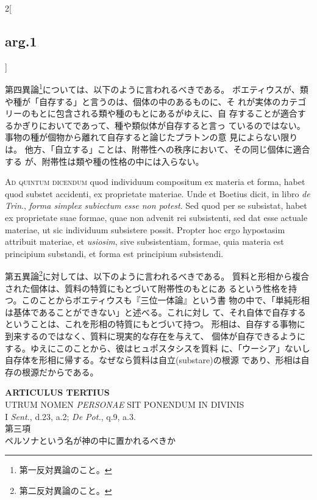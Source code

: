 \documentclass[paper=a4paper,fontsize=10pt,jafontsize=9pt,titlepage]{jlreq}
\begin{document}
\begin{paracol}{2}[\subsection{arg.1}]
\switchcolumn

第四異論\footnote{第一反対異論のこと。}については、以下のように言われるべきである。
ボエティウスが、類や種が「自存する」と言うのは、個体の中のあるものに、そ
 れが実体のカテゴリーのもとに包含される類や種のもとにあるがゆえに、自
 存することが適合するかぎりにおいてであって、種や類似体が自存すると言っ
 ているのではない。事物の種が個物から離れて自存すると論じたプラトンの意
 見によらない限りは。
他方、「自立する」ことは、附帯性への秩序において、その同じ個体に適合する
 が、附帯性は類や種の性格の中には入らない。

\switchcolumn*[\subsection{ad.5}]

{\scshape Ad quintum dicendum} quod individuum compositum ex materia et forma,
habet quod substet accidenti, ex proprietate materiae. Unde et Boetius
dicit, in libro {\itshape de Trin}., {\itshape forma simplex subiectum esse non potest}. Sed
quod per se subsistat, habet ex proprietate suae formae, quae non
advenit rei subsistenti, sed dat esse actuale materiae, ut sic
individuum subsistere possit. Propter hoc ergo hypostasim attribuit
materiae, et {\itshape usiosim}, sive subsistentiam, formae, quia materia est
principium substandi, et forma est principium subsistendi.

\switchcolumn

第五異論\footnote{第二反対異論のこと。}に対しては、以下のように言われるべきである。
質料と形相から複合された個体は、質料の特質にもとづいて附帯性のもとにあ
 るという性格を持つ。このことからボエティウスも『三位一体論』という書
 物の中で、「単純形相は基体であることができない」と述べる。これに対し
 て、それ自体で自存するということは、これを形相の特質にもとづいて持つ。
 形相は、自存する事物に到来するのではなく、質料に現実的な存在を与えて、
 個体が自存できるようにする。ゆえにこのことから、彼はヒュポスタシスを質料
 に、「ウーシア」ないし自存体を形相に帰する。なぜなら質料は自立(substare)の根源
 であり、形相は自存の根源だからである。

\end{paracol}
\newpage
{}
{}
\setcounter{section}{3}
\setcounter{subsection}{0}





\begin{center}
 {\Large {\bfseries ARTICULUS TERTIUS}}\\
 {\large UTRUM NOMEN {\itshape PERSONAE} SIT PONENDUM IN DIVINIS}\\
 {\footnotesize I {\itshape Sent.}, d.23, a.2; {\itshape De Pot.}, q.9, a.3.}\\
 {\Large 第三項\\ペルソナという名が神の中に置かれるべきか}
\end{center}
\end{document}
